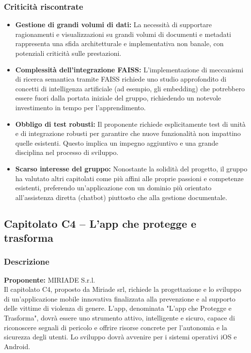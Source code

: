 \documentclass{article}
\begin{document}
	\subsubsection{Criticità riscontrate}
	\begin{itemize}
		\item \textbf{Gestione di grandi volumi di dati:} La necessità di supportare ragionamenti e visualizzazioni su grandi volumi di documenti e metadati rappresenta una sfida architetturale e implementativa non banale, con potenziali criticità sulle prestazioni.
		\item \textbf{Complessità dell'integrazione FAISS:} L'implementazione di meccanismi di ricerca semantica tramite FAISS richiede uno studio approfondito di concetti di intelligenza artificiale (ad esempio, gli embedding) che potrebbero essere fuori dalla portata iniziale del gruppo, richiedendo un notevole investimento in tempo per l'apprendimento.
		\item \textbf{Obbligo di test robusti:} Il proponente richiede esplicitamente test di unità e di integrazione robusti per garantire che nuove funzionalità non impattino quelle esistenti. Questo implica un impegno aggiuntivo e una grande disciplina nel processo di sviluppo.
        \item \textbf{Scarso interesse del gruppo:} Nonostante la solidità del progetto, il gruppo ha valutato altri capitolati come più affini alle proprie passioni e competenze esistenti, preferendo un'applicazione con un dominio più orientato all'assistenza diretta (chatbot) piuttosto che alla gestione documentale.
    \end{itemize}
	
	\subsection{Capitolato C4 – L'app che protegge e trasforma}
	\subsubsection{Descrizione}
    \textbf{Proponente:} MIRIADE S.r.l.\\
	Il capitolato C4, proposto da Miriade srl, richiede la progettazione e lo sviluppo di un'applicazione mobile innovativa finalizzata alla prevenzione e al supporto delle vittime di violenza di genere. L'app, denominata "L'app che Protegge e Trasforma", dovrà essere uno strumento attivo, intelligente e sicuro, capace di riconoscere segnali di pericolo e offrire risorse concrete per l'autonomia e la sicurezza degli utenti. Lo sviluppo dovrà avvenire per i sistemi operativi iOS e Android.
	
\end{document}
